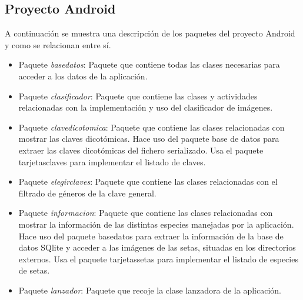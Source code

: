 \newpage
\subsection{Proyecto Android}

A continuación se muestra una descripción de los paquetes del proyecto Android y como se relacionan entre sí.

\begin{itemize}

	
	\item Paquete \textit{basedatos}: Paquete que contiene todas las clases necesarias para acceder a los datos de la aplicación.
	
	
	\item Paquete \textit{clasificador}: Paquete que contiene las clases y actividades relacionadas con la implementación y uso del clasificador de imágenes.
	
	
	\item Paquete \textit{clavedicotomica}: Paquete que contiene las clases relacionadas con mostrar las claves dicotómicas. Hace uso del paquete base de datos para extraer las claves dicotómicas del fichero serializado. Usa el paquete tarjetasclaves para implementar el listado de claves.
	
	
	\item Paquete \textit{elegirclaves}: Paquete que contiene las clases relacionadas con el filtrado de géneros de la clave general. 
	
	
	\item Paquete \textit{informacion}: Paquete que contiene las clases relacionadas con mostrar la información de las distintas especies manejadas por la aplicación. Hace uso del paquete basedatos para extraer la información de la base de datos SQlite y acceder a las imágenes de las setas, situadas en los directorios externos. Usa el paquete tarjetassetas para implementar el listado de especies de setas.
	
	
	\item Paquete \textit{lanzador}: Paquete que recoje la clase lanzadora de la aplicación.
	
	

\end{itemize}

